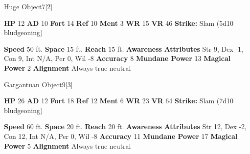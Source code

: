   

  \begin{monsubsection}{Huge Object}{7}[2]
    \vspace{-1em}\vspace{-1em}
    \vspace{0em}

    
    

    \begin{spellcontent}
      \begin{spelltargetinginfo}
        \pari \textbf{HP} 12 \monsep
          \textbf{AD} 10 \monsep
          \textbf{Fort} 14 \monsep
          \textbf{Ref} 10 \monsep
          \textbf{Ment} 3
        \pari \textbf{WR} 15 \monsep
        \textbf{VR} 46
        \pari \textbf{Strike:}
            Slam  (5d10 bludgeoning)
      \end{spelltargetinginfo}
    \end{spellcontent}
    \begin{monsterfooter}
      \pari \textbf{Speed} 50 ft. \monsep
        \textbf{Space} 15 ft. \monsep
        \textbf{Reach} 15 ft.
      \pari \textbf{Awareness} 
      \pari \textbf{Attributes}
        Str 9, Dex -1,
        Con 9, Int N/A,
        Per 0, Wil -8
      \pari \textbf{Accuracy} 8 \monsep
        \textbf{Mundane Power} 13 \monsep
      \textbf{Magical Power} 2
      \pari \textbf{Alignment} Always true neutral
    \end{monsterfooter}
  \end{monsubsection}
  
  

  \begin{monsubsection}{Gargantuan Object}{9}[3]
    \vspace{-1em}\vspace{-1em}
    \vspace{0em}

    
    

    \begin{spellcontent}
      \begin{spelltargetinginfo}
        \pari \textbf{HP} 26 \monsep
          \textbf{AD} 12 \monsep
          \textbf{Fort} 18 \monsep
          \textbf{Ref} 12 \monsep
          \textbf{Ment} 6
        \pari \textbf{WR} 23 \monsep
        \textbf{VR} 64
        \pari \textbf{Strike:}
            Slam  (7d10 bludgeoning)
      \end{spelltargetinginfo}
    \end{spellcontent}
    \begin{monsterfooter}
      \pari \textbf{Speed} 60 ft. \monsep
        \textbf{Space} 20 ft. \monsep
        \textbf{Reach} 20 ft.
      \pari \textbf{Awareness} 
      \pari \textbf{Attributes}
        Str 12, Dex -2,
        Con 12, Int N/A,
        Per 0, Wil -8
      \pari \textbf{Accuracy} 11 \monsep
        \textbf{Mundane Power} 17 \monsep
      \textbf{Magical Power} 5
      \pari \textbf{Alignment} Always true neutral
    \end{monsterfooter}
  \end{monsubsection}
  
